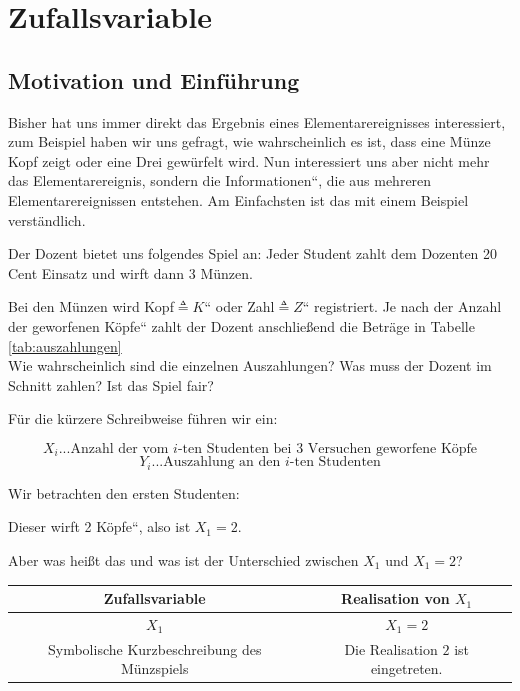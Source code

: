 {
    \chapter{Zufallsvariable}

    \section{Motivation und Einführung}

    Bisher hat uns immer direkt das Ergebnis eines Elementarereignisses
    interessiert, zum Beispiel haben wir uns gefragt, wie wahrscheinlich es
    ist, dass eine Münze Kopf zeigt oder eine Drei gewürfelt wird. Nun
    interessiert uns aber nicht mehr das Elementarereignis, sondern die
    {\quotedblbase}Informationen{\textquotedblleft}, die aus mehreren
    Elementarereignissen entstehen. Am Einfachsten ist das mit einem
    Beispiel verständlich. 

    \begin{bsp}\label{bsp:muenze}
    Der Dozent bietet uns folgendes Spiel an: Jeder Student zahlt dem
    Dozenten 20 Cent Einsatz und wirft dann 3 Münzen. 
    
    Bei den Münzen wird
    {\quotedblbase}Kopf${\triangleq}K${\textquotedblleft} oder
    {\quotedblbase}Zahl${\triangleq}Z${\textquotedblleft} registriert. Je
    nach der Anzahl der geworfenen {\quotedblbase}Köpfe{\textquotedblleft}
    zahlt der Dozent anschließend die Beträge in Tabelle \ref{tab:auszahlungen}\\

    Wie wahrscheinlich sind die einzelnen Auszahlungen? Was muss der Dozent
    im Schnitt zahlen? Ist das Spiel fair? 
    
    Für die kürzere Schreibweise führen wir ein:

    \[X_{i}...\text{Anzahl der vom }i\text{-ten Studenten bei 3 Versuchen geworfene Köpfe}\]
    \[Y_{i}...\text{Auszahlung an den }i\text{-ten Studenten}\]

    Wir betrachten den ersten Studenten:

    Dieser wirft 2 {\quotedblbase}Köpfe{\textquotedblleft}, also ist $X_{1}=2$.

    Aber was heißt das und was ist der Unterschied zwischen $X_{1}$ und $X_{1}=2$?

    \begin{center}
    \begin{tabular}{c|c}
    \hline
    \textbf{Zufallsvariable} & \textbf{Realisation von $X_1$}\\
    \hline
     $X_1$ & $X_1=2$\\
     \parbox[t]{0.33\linewidth}{Symbolische Kurzbeschreibung des Münzspiels} 
            & \parbox[t]{0.33\linewidth}{Die Realisation $2$ ist eingetreten.}\\
     \hline
    \end{tabular}
    \end{center}


\end{bsp}}
